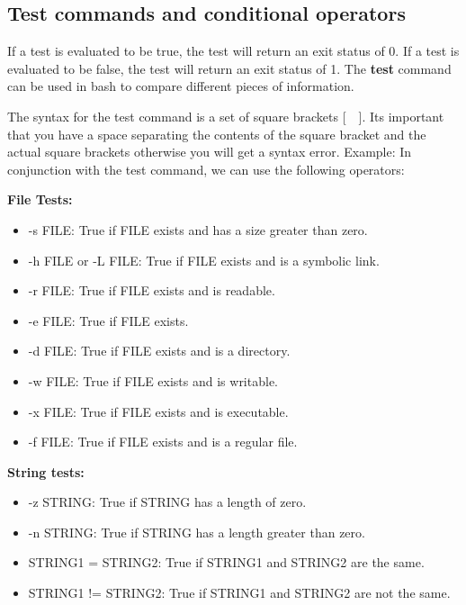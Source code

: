 \documentclass{report}
\begin{document}
    \bigbreak \noindent 
    \subsection{Test commands and conditional operators}
    \bigbreak \noindent 
    \begin{concept}
       If a test is evaluated to be true, the test will return an exit status of 0. If a test is evaluated to be false, the test will return an exit status of 1. The \textbf{test} command can be used in bash to compare different pieces of information.
    \end{concept}
    \bigbreak \noindent 
    The syntax for the test command is a set of square brackets [\ \ ]. Its important that you have a space separating the contents of the square bracket and the actual square brackets otherwise you will get a syntax error.
    \bigbreak \noindent 
    \bigbreak \noindent 
    Example:
    \bigbreak \noindent 
    In conjunction with the test command, we can use the following operators:
    \bigbreak \noindent 
    \begin{minipage}[t]{0.47\textwidth}
        \textbf{File Tests:}
        \begin{itemize}
            \item -s FILE: True if FILE exists and has a size greater than zero.
            \item -h FILE or -L FILE: True if FILE exists and is a symbolic link.
            \item -r FILE: True if FILE exists and is readable.
            \item -e FILE: True if FILE exists.
            \item -d FILE: True if FILE exists and is a directory.
            \item -w FILE: True if FILE exists and is writable.
            \item -x FILE: True if FILE exists and is executable.
            \item -f FILE: True if FILE exists and is a regular file.
        \end{itemize}
    \end{minipage}
    \begin{minipage}[t]{0.47\textwidth}
        \textbf{String tests:}
        \begin{itemize}
            \item -z STRING: True if STRING has a length of zero.
            \item -n STRING: True if STRING has a length greater than zero.
            \item STRING1 = STRING2: True if STRING1 and STRING2 are the same.
            \item STRING1 != STRING2: True if STRING1 and STRING2 are not the same.
        \end{itemize}
    \end{minipage}
\end{document}
